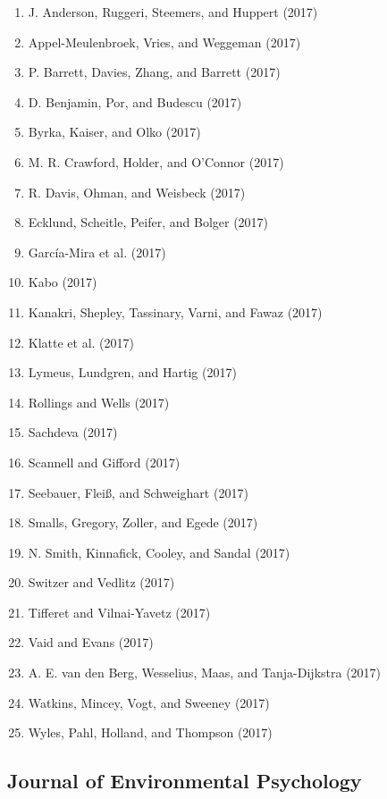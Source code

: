 \documentclass[english,man]{apa6}
\providecommand{\tightlist}{%
  \setlength{\itemsep}{0pt}\setlength{\parskip}{0pt}}
\theoremstyle{definition}
\theoremstyle{definition}
\theoremstyle{definition}
\theoremstyle{remark}
\begin{document}
\begin{enumerate}
\def\labelenumi{\arabic{enumi})}
\tightlist
\item
  J. Anderson, Ruggeri, Steemers, and Huppert (2017)
\item
  Appel-Meulenbroek, Vries, and Weggeman (2017)
\item
  P. Barrett, Davies, Zhang, and Barrett (2017)
\item
  D. Benjamin, Por, and Budescu (2017)
\item
  Byrka, Kaiser, and Olko (2017)
\item
  M. R. Crawford, Holder, and O'Connor (2017)
\item
  R. Davis, Ohman, and Weisbeck (2017)
\item
  Ecklund, Scheitle, Peifer, and Bolger (2017)
\item
  García-Mira et al. (2017)
\item
  Kabo (2017)
\item
  Kanakri, Shepley, Tassinary, Varni, and Fawaz (2017)
\item
  Klatte et al. (2017)
\item
  Lymeus, Lundgren, and Hartig (2017)
\item
  Rollings and Wells (2017)
\item
  Sachdeva (2017)
\item
  Scannell and Gifford (2017)
\item
  Seebauer, Fleiß, and Schweighart (2017)
\item
  Smalls, Gregory, Zoller, and Egede (2017)
\item
  N. Smith, Kinnafick, Cooley, and Sandal (2017)
\item
  Switzer and Vedlitz (2017)
\item
  Tifferet and Vilnai-Yavetz (2017)
\item
  Vaid and Evans (2017)
\item
  A. E. van den Berg, Wesselius, Maas, and Tanja-Dijkstra (2017)
\item
  Watkins, Mincey, Vogt, and Sweeney (2017)
\item
  Wyles, Pahl, Holland, and Thompson (2017)
\end{enumerate}

\subsection{Journal of Environmental
Psychology}\label{journal-of-environmental-psychology}
\end{document}
